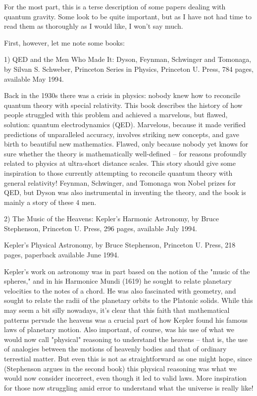 

For the most part, this is a terse description of some papers dealing
with quantum gravity.  Some look to be quite important, but as I have
not had time to read them as thoroughly as I would like, I won't say
much.

First, however, let me note some books:

1) QED and the Men Who Made It: Dyson, Feynman, Schwinger and Tomonaga,
by Silvan S. Schweber, Princeton Series in Physics, Princeton U. Press,
784 pages, available May 1994.

Back in the 1930s there was a crisis in physics: nobody knew how to
reconcile quantum theory with special relativity.  This book describes
the history of how people struggled with this problem and achieved a
marvelous, but flawed, solution: quantum electrodynamics (QED).
Marvelous, because it made verified predictions of unparalleled
accuracy, involves striking new concepts, and gave birth to beautiful
new mathematics.  Flawed, only because nobody yet knows for sure whether
the theory is mathematically well-defined -- for reasons profoundly
related to physics at ultra-short distance scales.  This story should
give some inspiration to those currently attempting to reconcile quantum
theory with general relativity!  Feynman, Schwinger, and Tomonaga won
Nobel prizes for QED, but Dyson was also instrumental in inventing the
theory, and the book is mainly a story of these 4 men.

2) The Music of the Heavens: Kepler's Harmonic Astronomy, by Bruce
Stephenson, Princeton U. Press, 296 pages, available July 1994. 

Kepler's Physical Astronomy, by Bruce Stephenson, Princeton U. Press,
218 pages, paperback available June 1994.

Kepler's work on astronomy was in part based on the notion of the
"music of the spheres," and in his Harmonice Mundi (1619) he sought to
relate planetary velocities to the notes of a chord.  He was also
fascinated with geometry, and sought to relate the radii of the
planetary orbits to the Platonic solids.  While this may seem a bit
silly nowadays, it's clear that this faith that mathematical
patterns pervade the heavens was a crucial part of how Kepler found his
famous laws of planetary motion.  Also important, of course, was his
use of what we would now call "physical" reasoning to understand the
heavens -- that is, the use of analogies between the motions of heavenly
bodies and that of ordinary terrestial matter.  But even this is not as
straightforward as one might hope, since (Stephenson argues in the
second book) this physical reasoning was what we would now consider
incorrect, even though it led to valid laws.  More inspiration for those
now struggling amid error to understand what the universe is really
like!

